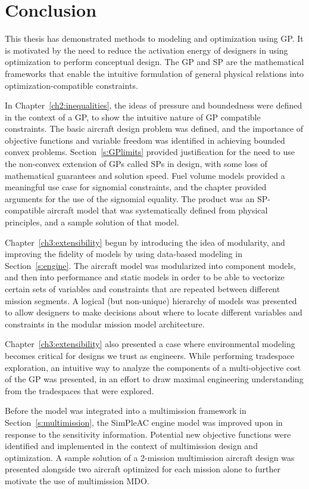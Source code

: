 \chapter{Conclusion}
\label{ch5:conclusion}

This thesis has demonstrated methods to modeling and optimization using \gls{GP}. It
is motivated by the need to reduce the activation energy of designers in using
optimization to perform conceptual design. The \gls{GP} and \gls{SP} are the
mathematical frameworks that enable the intuitive formulation of general
physical relations into optimization-compatible constraints.

In Chapter~\ref{ch2:inequalities}, the ideas of pressure and boundedness were
defined in the context of a \gls{GP}, to show the intuitive nature of \gls{GP}
compatible constraints. The basic aircraft design problem was defined,
and the importance of objective functions and variable freedom
was identified in achieving bounded convex problems.
Section~\ref{s:GPlimits} provided justification for the need to use the non-convex
extension of \gls{GP}s called \gls{SP}s in design, with some loss of mathematical
guarantees and solution speed. Fuel volume models provided a meaningful use
case for signomial constraints, and the chapter provided arguments for the use of the signomial
equality. The product was an \gls{SP}-compatible aircraft model that was systematically defined from
physical principles, and a sample solution of that model.

Chapter~\ref{ch3:extensibility} begun by introducing the idea of modularity, and improving
the fidelity of models by using data-based modeling in Section~\ref{s:engine}.
The aircraft model was modularized
into component models, and then into performance and static models in order to
be able to vectorize certain sets of variables and constraints that are repeated between
different mission segments. A logical (but non-unique) hierarchy of models
was presented to allow designers to make decisions about where to locate different variables
and constraints in the modular mission model architecture.

Chapter~\ref{ch3:extensibility} also presented a case where environmental modeling becomes critical
for designs we trust as engineers. While performing tradespace exploration, an intuitive
way to analyze the components of a multi-objective cost of the \gls{GP} was presented, in
an effort to draw maximal engineering understanding from the tradespaces that were explored.

Before the model was integrated into a multimission framework in Section~\ref{s:multimission},
the SimPleAC engine model was improved upon
in response to the sensitivity information. Potential
new objective functions were identified and implemented in the context of multimission design
and optimization.
A sample solution of a 2-mission multimission aircraft design
was presented alongside two aircraft optimized for each mission alone to further motivate
the use of multimission \gls{MDO}.


